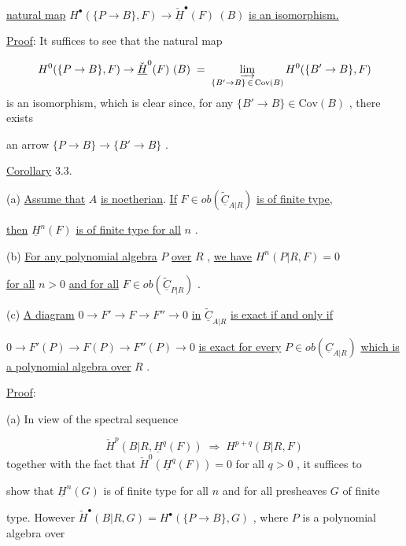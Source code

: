 \underline{natural map}  $H^{\bullet}(\{P \to B\},F) \to \check{\underline{H}}^{\bullet}(F)\ (B)$  \underline{is an isomorphism.}

\underline{Proof}:  It suffices to see that the natural map

\begin{equation*}
H^{0}(\{P \to B\},F) \to \check{\underline{H}}^{0}(F)\ (B) \;=\; \varinjlim_{\{B' \to B\}\, \in\, \mathrm{Cov}(B)} H^{0}(\{B' \to B\},F)
\end{equation*}
is an isomorphism, which is clear since, for any  $\{B' \to B\} \in \mathrm{Cov}(B)$  , there exists

an arrow  $\{P \to B\} \to \{B' \to B\}$  .


\underline{Corollary} 3.3.

(a)  \underline{Assume that}  $A$  \underline{is noetherian}. \underline{If}  $F \in ob(\widetilde{\underline{C}}_{A|R})$  \underline{is of finite type,}

\underline{then}  $\underline{H}^{n}(F)$  \underline{is of finite type for all}  $n$  .

(b)  \underline{For any polynomial algebra}  $P$  \underline{over}  $R$  , \underline{we have}  $H^{n}(P|R,F) = 0$

\underline{for all}  $n > 0$  \underline{and for all}  $F \in ob(\widetilde{\underline{C}}_{P|R})$  .

(c)  \underline{A diagram}  $0 \to F' \to F \to F'' \to 0$  \underline{in}  $\widetilde{\underline{C}}_{A|R}$  \underline{is exact if and only if}

$0 \to F'(P) \to F(P) \to F''(P) \to 0$  \underline{is exact for every}  $P \in ob(\underline{C}_{A|R})$  \underline{which is a polynomial algebra over}  $R$  .

\underline{Proof}:

(a)  In view of the spectral sequence

\begin{equation*}
\check{H}^{p}(B|R,\underline{H}^{q}(F)) \;\Rightarrow\; H^{p+q}(B|R,F)
\end{equation*}
together with the fact that  $\check{H}^{0}(\underline{H}^{q}(F)) = 0$  for all  $q > 0$  , it suffices to

show that  $\underline{H}^{n}(G)$  is of finite type for all  $n$  and for all presheaves  $G$  of finite

type. However  $\check{H}^{\bullet}(B|R,G) = H^{\bullet}(\{P \to B\},G)$  , where  $P$  is a polynomial algebra over

